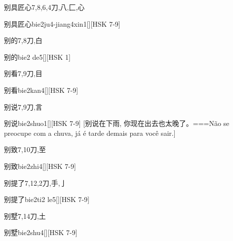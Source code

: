 \begin{Entry}{别具匠心}{7,8,6,4}{⼑,⼋,⼕,⼼}
  \begin{Phonetics}{别具匠心}{bie2ju4-jiang4xin1}[][HSK 7-9]
  \end{Phonetics}
\end{Entry}

\begin{Entry}{别的}{7,8}{⼑,⽩}
  \begin{Phonetics}{别的}{bie2 de5}[][HSK 1]
  \end{Phonetics}
\end{Entry}

\begin{Entry}{别看}{7,9}{⼑,⽬}
  \begin{Phonetics}{别看}{bie2kan4}[][HSK 7-9]
  \end{Phonetics}
\end{Entry}

\begin{Entry}{别说}{7,9}{⼑,⾔}
  \begin{Phonetics}{别说}{bie2shuo1}[][HSK 7-9]
    [别说在下雨, 你现在出去也太晚了。===Não se preocupe com a chuva, já é tarde demais para você sair.]
  \end{Phonetics}
\end{Entry}

\begin{Entry}{别致}{7,10}{⼑,⾄}
  \begin{Phonetics}{别致}{bie2zhi4}[][HSK 7-9]
  \end{Phonetics}
\end{Entry}

\begin{Entry}{别提了}{7,12,2}{⼑,⼿,⼅}
  \begin{Phonetics}{别提了}{bie2ti2 le5}[][HSK 7-9]
  \end{Phonetics}
\end{Entry}

\begin{Entry}{别墅}{7,14}{⼑,⼟}
  \begin{Phonetics}{别墅}{bie2shu4}[][HSK 7-9]
  \end{Phonetics}
\end{Entry}

